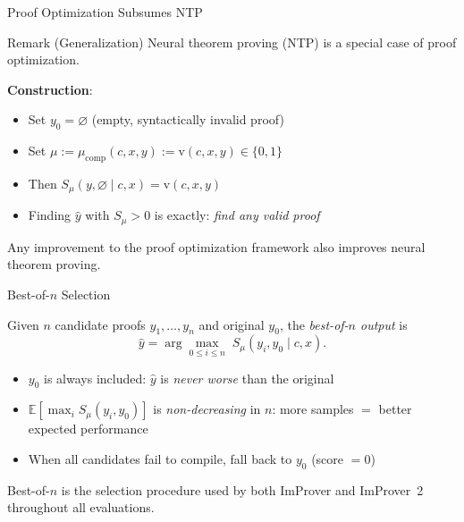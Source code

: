 \begin{frame}{Proof Optimization Subsumes NTP}
\vspace{0.5em}
\begin{block}{Remark (Generalization)}
Neural theorem proving (NTP) is a special case of proof optimization.
\end{block}
\vspace{0.6em}
\textbf{Construction}:
\begin{itemize}\setlength{\itemsep}{8pt}
  \item Set $y_0 = \varnothing$ (empty, syntactically invalid proof)
  \item Set $\mu := \mu_{\mathrm{comp}}(c,x,y) := \mathrm{v}(c,x,y) \in \{0,1\}$
  \item Then $S_\mu(y, \varnothing \mid c, x) = \mathrm{v}(c,x,y)$
  \item Finding $\hat{y}$ with $S_\mu > 0$ is exactly: \emph{find any valid proof}
\end{itemize}
\vspace{0.6em}
\begin{exampleblock}{}
  \centering Any improvement to the proof optimization framework also improves neural theorem proving.
\end{exampleblock}
\end{frame}

\begin{frame}{Best-of-$n$ Selection}
\vspace{0.3em}
\begin{definition}[Best-of-$n$]
Given $n$ candidate proofs $y_1,\dots,y_n$ and original $y_0$, the \emph{best-of-$n$ output} is
\[
  \hat{y} = \arg\max_{0 \le i \le n}\; S_\mu(y_i, y_0 \mid c, x).
\]
\end{definition}
\vspace{0.4em}
\begin{itemize}\setlength{\itemsep}{8pt}
  \item $y_0$ is always included: $\hat{y}$ is \emph{never worse} than the original
  \item $\mathbb{E}[\max_i S_\mu(y_i, y_0)]$ is \emph{non-decreasing} in $n$: more samples $=$ better expected performance
  \item When all candidates fail to compile, fall back to $y_0$ (score $= 0$)
\end{itemize}
\vspace{0.5em}
\begin{block}{}
Best-of-$n$ is the selection procedure used by both ImProver and ImProver~2 throughout all evaluations.
\end{block}
\end{frame}

